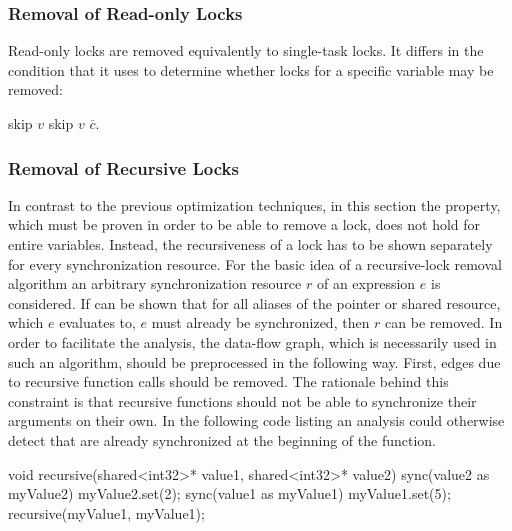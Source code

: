 \subsubsection{Removal of Read-only Locks}
Read-only locks are removed equivalently to single-task locks. It differs in the condition that it uses to determine whether locks for a specific variable may be removed: 
\begin{algorithmic}
 
    \State skip $v$
    \State skip $v$
  \EndIf
  \State $\overline{c}$. 
\EndFor
\State {}
\EndFunction
\end{algorithmic}

\subsubsection{Removal of Recursive Locks}
In contrast to the previous optimization techniques, in this section the property, which must be proven in order to be able to remove a lock, does not hold for entire variables. Instead, the recursiveness of a lock has to be shown separately for every synchronization resource. For the basic idea of a recursive-lock removal algorithm an arbitrary synchronization resource $r$ of an expression $e$ is considered. If can be shown that for all aliases of the pointer or shared resource, which $e$ evaluates to, $e$ must already be synchronized, then $r$ can be removed. In order to facilitate the analysis, the data-flow graph, which is necessarily used in such an algorithm, should be preprocessed in the following way. First, edges due to recursive function calls should be removed. The rationale behind this constraint is that recursive functions should not be able to synchronize their arguments on their own. In the following code listing an analysis  could otherwise  detect that   are already synchronized at the beginning of the function.
\begin{ccode}
void recursive(shared<int32>* value1, shared<int32>* value2) {
  sync(value2 as myValue2) {
    myValue2.set(2);
  }
  sync(value1 as myValue1) {
    myValue1.set(5);
    recursive(myValue1, myValue1);
  }
}
\end{ccode}

